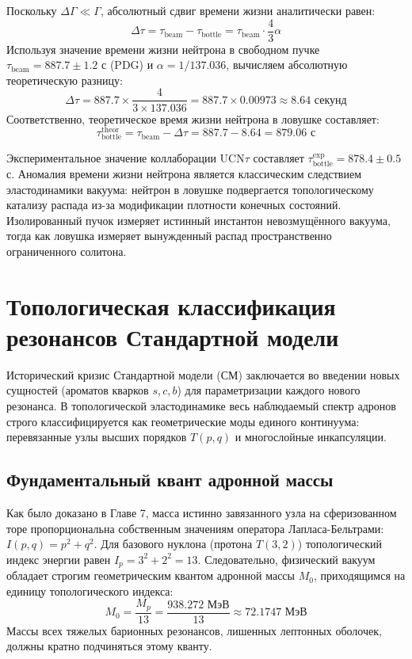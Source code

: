 \documentclass[12pt,a4paper]{article}
\begin{document}
	Поскольку $\Delta \Gamma \ll \Gamma$, абсолютный сдвиг времени жизни аналитически равен:
	\begin{equation}
		\Delta \tau = \tau_{\text{beam}} - \tau_{\text{bottle}} = \tau_{\text{beam}} \cdot \frac{4}{3} \alpha
	\end{equation}
	Используя значение времени жизни нейтрона в свободном пучке $\tau_{\text{beam}} = 887.7 \pm 1.2$ с (PDG) и $\alpha = 1/137.036$, вычисляем абсолютную теоретическую разницу:
	\begin{equation}
		\Delta \tau = 887.7 \times \frac{4}{3 \times 137.036} = 887.7 \times 0.00973 \approx \mathbf{8.64 \text{ секунд}}
	\end{equation}
	Соответственно, теоретическое время жизни нейтрона в ловушке составляет:
	\begin{equation}
		\tau_{\text{bottle}}^{\text{theor}} = \tau_{\text{beam}} - \Delta\tau = 887.7 - 8.64 = \mathbf{879.06 \text{ с}}
	\end{equation}
	
	Экспериментальное значение коллаборации UCN$\tau$ составляет $\tau_{\text{bottle}}^{\text{exp}} = 878.4 \pm 0.5$ с. 
	Аномалия времени жизни нейтрона является классическим следствием эластодинамики вакуума: нейтрон в ловушке подвергается топологическому катализу распада из-за модификации плотности конечных состояний. Изолированный пучок измеряет истинный инстантон невозмущённого вакуума, тогда как ловушка измеряет вынужденный распад пространственно ограниченного солитона.
	
	\section{Топологическая классификация резонансов Стандартной модели}
	
	Исторический кризис Стандартной модели (СМ) заключается во введении новых сущностей (ароматов кварков $s, c, b$) для параметризации каждого нового резонанса. В топологической эластодинамике весь наблюдаемый спектр адронов строго классифицируется как геометрические моды единого континуума: перевязанные узлы высших порядков $T(p,q)$ и многослойные инкапсуляции.
	
	\subsection{Фундаментальный квант адронной массы}
	Как было доказано в Главе 7, масса истинно завязанного узла на сферизованном торе пропорциональна собственным значениям оператора Лапласа-Бельтрами: $I(p,q) = p^2 + q^2$.
	Для базового нуклона (протона $T(3,2)$) топологический индекс энергии равен $I_p = 3^2 + 2^2 = 13$.
	Следовательно, физический вакуум обладает строгим геометрическим квантом адронной массы $M_0$, приходящимся на единицу топологического индекса:
	\begin{equation}
		M_0 = \frac{M_p}{13} = \frac{938.272 \text{ МэВ}}{13} \approx \mathbf{72.1747 \text{ МэВ}}
	\end{equation}
	Массы всех тяжелых барионных резонансов, лишенных лептонных оболочек, должны кратно подчиняться этому кванту.
	
\end{document}
